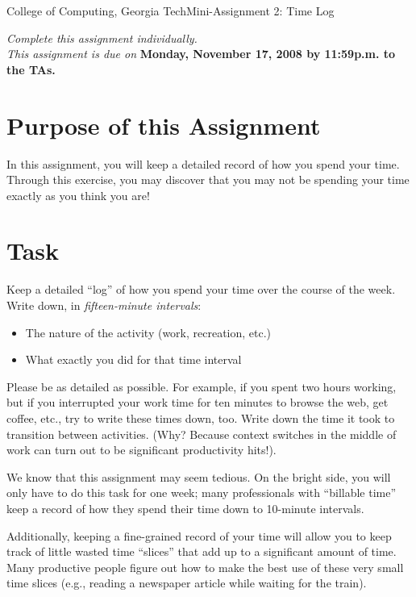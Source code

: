 \documentclass[11pt]{article}
\begin{document}


{College of Computing, Georgia Tech}{Mini-Assignment 2: Time Log}

{\em Complete this assignment individually. \\  This
  assignment is due on} {\bf Monday, November 17, 2008 by 11:59p.m. to
  the TAs.}

\section{Purpose of this Assignment}

In this assignment, you will keep a detailed record of how you spend
your time.  Through this exercise, you may discover that you may not be
spending your time exactly as you think you are!

\section{Task}

Keep a detailed ``log'' of how you spend your time over the course of
the week.  Write down, in {\em fifteen-minute intervals}:
\begin{itemize}
\item The nature of the activity (work, recreation, etc.)
\item What exactly you did for that time interval
\end{itemize}

Please be as detailed as possible.  For example, if you spent two hours
working, but if you interrupted your work time for ten minutes to browse
the web, get coffee, etc., try to write these times down, too.  Write
down the time it took to transition between activities.  (Why?  Because
context switches in the middle of work can turn out to be significant
productivity hits!).

We know that this assignment may seem tedious.  On the bright side, you
will only have to do this task for one week; many professionals with
``billable time'' keep a record of how they spend their time down to
10-minute intervals.   

Additionally, keeping a fine-grained record of your time will allow you
to keep track of little wasted time ``slices'' that add up to a
significant amount of time.  Many productive people figure out how to
make the best use of these very small time slices (e.g., reading a
newspaper article while waiting for the train).
\end{document}
